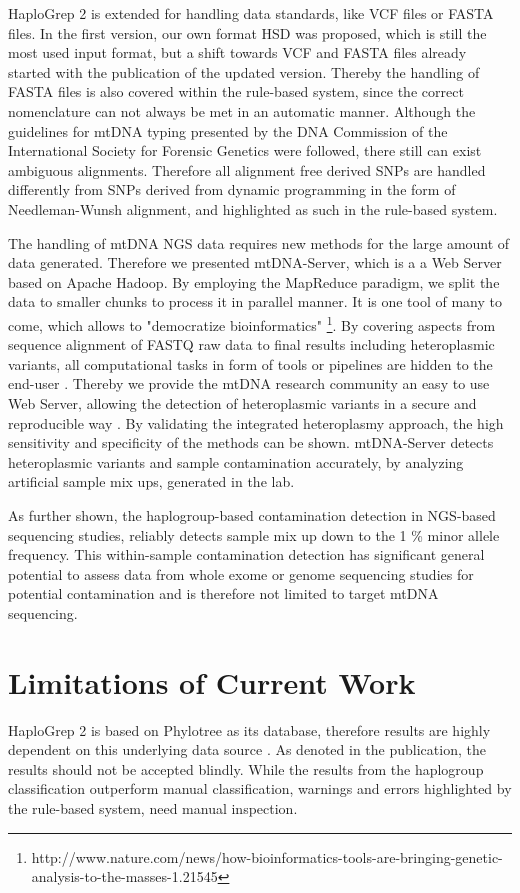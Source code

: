 HaploGrep 2 is extended for handling data standards, like VCF files or FASTA files. In the first version, our own format HSD was proposed, which is still the most used input format, but a shift towards VCF and FASTA files already started with the publication of the updated version. Thereby the handling of FASTA files is also covered within the rule-based system, since the correct nomenclature can not always be met in an automatic manner.  Although the guidelines for mtDNA typing presented by the DNA Commission of the International Society for Forensic Genetics \cite{Parson2014} were followed, there still can exist ambiguous alignments. Therefore all alignment free derived SNPs are handled differently from SNPs derived from dynamic programming in the form of Needleman-Wunsh alignment, and highlighted as such in the rule-based system.

The handling of mtDNA NGS data requires new methods for the large amount of data generated. Therefore we presented mtDNA-Server, which is a a Web 
Server based on Apache Hadoop. By employing the MapReduce paradigm, we split the data to smaller chunks to process it in parallel manner. It is one tool of many to come, which allows to "democratize bioinformatics" \footnote{http://www.nature.com/news/how-bioinformatics-tools-are-bringing-genetic-analysis-to-the-masses-1.21545}. By covering aspects from sequence alignment of FASTQ raw data to final results including heteroplasmic variants, all computational tasks in form of tools or pipelines are hidden to the end-user \cite{Weissensteiner2016b}.  Thereby we provide the mtDNA research community an easy to use Web Server, allowing the detection of heteroplasmic variants in a secure and reproducible way \cite{Weissensteiner2016b}. By validating the integrated heteroplasmy approach, the high sensitivity and specificity of the methods can be shown. mtDNA-Server detects heteroplasmic variants and sample contamination accurately, by analyzing artificial sample mix ups, generated in the lab.

As further shown, the haplogroup-based contamination detection in NGS-based sequencing studies, reliably detects sample mix up down to the 1 \% minor allele frequency. 
This within-sample contamination detection has significant general potential to assess data from whole exome or genome sequencing studies for potential contamination and is therefore not limited to target mtDNA sequencing. 

\section{Limitations of Current Work}
\label{disc:sec2}
HaploGrep 2 is based on Phylotree as its database, therefore results are highly dependent on this underlying data source \cite{Weissensteiner2016a}. As denoted in the publication, the results should not be accepted blindly. While the results from the haplogroup classification outperform manual classification, warnings and errors highlighted by the rule-based system, need manual inspection. 

